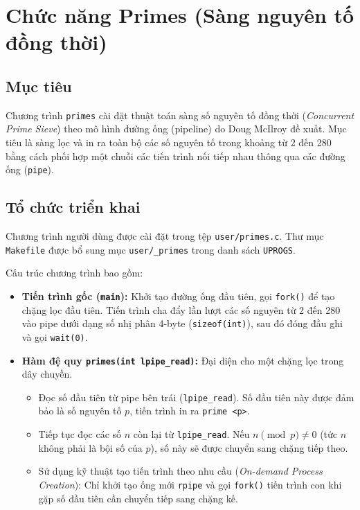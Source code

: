\section{Chức năng Primes (Sàng nguyên tố đồng thời)}

\subsection{Mục tiêu}
Chương trình \texttt{primes} cài đặt thuật toán sàng số nguyên tố đồng thời (\textit{Concurrent Prime Sieve}) theo mô hình đường ống (pipeline) do Doug McIlroy đề xuất. Mục tiêu là sàng lọc và in ra toàn bộ các số nguyên tố trong khoảng từ 2 đến 280 bằng cách phối hợp một chuỗi các tiến trình nối tiếp nhau thông qua các đường ống (\texttt{pipe}).

\subsection{Tổ chức triển khai}
Chương trình người dùng được cài đặt trong tệp \texttt{user/primes.c}. Thư mục \texttt{Makefile} được bổ sung mục \texttt{user/\_primes} trong danh sách \texttt{UPROGS}.

Cấu trúc chương trình bao gồm:
\begin{itemize}
  \item \textbf{Tiến trình gốc (\texttt{main}):} Khởi tạo đường ống đầu tiên, gọi \texttt{fork()} để tạo chặng lọc đầu tiên. Tiến trình cha đẩy lần lượt các số nguyên từ 2 đến 280 vào pipe dưới dạng số nhị phân 4-byte (\texttt{sizeof(int)}), sau đó đóng đầu ghi và gọi \texttt{wait(0)}.
  \item \textbf{Hàm đệ quy \texttt{primes(int lpipe\_read)}:} Đại diện cho một chặng lọc trong dây chuyền.
    \begin{itemize}
      \item Đọc số đầu tiên từ pipe bên trái (\texttt{lpipe\_read}). Số đầu tiên này được đảm bảo là số nguyên tố $p$, tiến trình in ra \texttt{prime <p>}.
      \item Tiếp tục đọc các số $n$ còn lại từ \texttt{lpipe\_read}. Nếu $n \pmod p \neq 0$ (tức $n$ không phải là bội số của $p$), số này sẽ được chuyển sang chặng tiếp theo.
      \item Sử dụng kỹ thuật tạo tiến trình theo nhu cầu (\textit{On-demand Process Creation}): Chỉ khởi tạo ống mới \texttt{rpipe} và gọi \texttt{fork()} tiến trình con khi gặp số đầu tiên cần chuyển tiếp sang chặng kế.
    \end{itemize}
\end{itemize}

